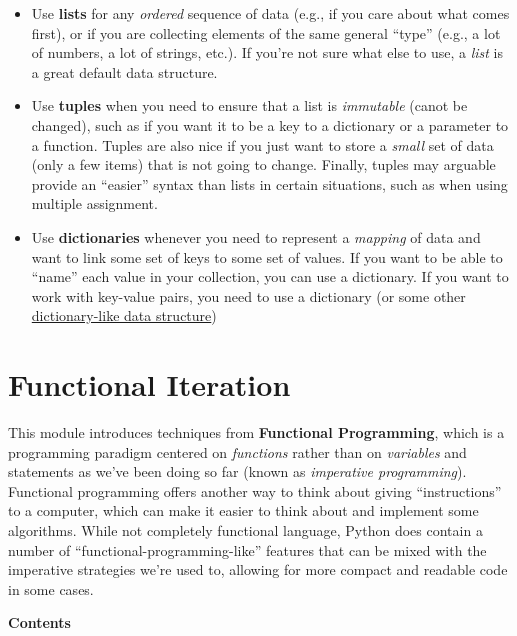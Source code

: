 \documentclass[]{book}
\begin{document}
\begin{itemize}
\item
  Use \textbf{lists} for any \emph{ordered} sequence of data (e.g., if
  you care about what comes first), or if you are collecting elements of
  the same general ``type'' (e.g., a lot of numbers, a lot of strings,
  etc.). If you're not sure what else to use, a \emph{list} is a great
  default data structure.
\item
  Use \textbf{tuples} when you need to ensure that a list is
  \emph{immutable} (canot be changed), such as if you want it to be a
  key to a dictionary or a parameter to a function. Tuples are also nice
  if you just want to store a \emph{small} set of data (only a few
  items) that is not going to change. Finally, tuples may arguable
  provide an ``easier'' syntax than lists in certain situations, such as
  when using multiple assignment.
\item
  Use \textbf{dictionaries} whenever you need to represent a
  \emph{mapping} of data and want to link some set of keys to some set
  of values. If you want to be able to ``name'' each value in your
  collection, you can use a dictionary. If you want to work with
  key-value pairs, you need to use a dictionary (or some other
  \href{https://docs.python.org/3/library/collections.html\#namedtuple-factory-function-for-tuples-with-named-fields}{dictionary-like
  data structure})
\end{itemize}

\chapter{Functional Iteration}\label{functional-iteration}

This module introduces techniques from \textbf{Functional Programming},
which is a programming paradigm centered on \emph{functions} rather than
on \emph{variables} and statements as we've been doing so far (known as
\emph{imperative programming}). Functional programming offers another
way to think about giving ``instructions'' to a computer, which can make
it easier to think about and implement some algorithms. While not
completely functional language, Python does contain a number of
``functional-programming-like'' features that can be mixed with the
imperative strategies we're used to, allowing for more compact and
readable code in some cases.

\textbf{Contents}
\end{document}
